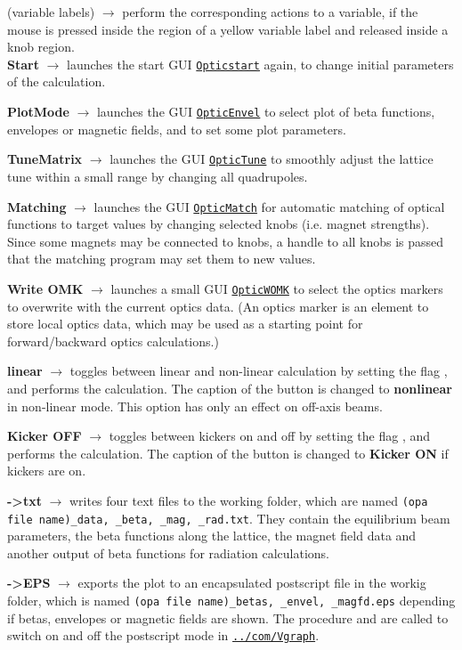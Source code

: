\documentclass[12pt]{article}
\newcommand\code[1]{{\tt #1}}
\newcommand{\ofld}[1]{\colorbox{black!15}{{\bf #1}}}
\newcommand{\ofldx}[1]{\colorbox{black!15}{(#1)}}
\newcommand\guico[1]{{\color{blue}\code{#1}}}
\newcommand\guifco[1]{{\color{violet}\code{#1}}}
\newcommand{\unico}[1]{{\color{burntorange}\code{#1}}}
\newcommand{\evcod}[2]{\ofld{#1} $\rightarrow$ \guico{#2}}
\newcommand{\evcodx}[2]{\ofldx{#1} $\rightarrow$ \guico{#2}}
\newcommand{\opagui}[1]{\colorbox{blue!20}{\code{#1}}}
\newcommand{\ogui}[1]{\hyperref[#1]{\opagui{#1}}}
\newcommand{\opaguif}[1]{\colorbox{violet!30}{\code{#1}}}
\newcommand{\oguif}[1]{\hyperref[#1]{\opaguif{#1}}}
\begin{document}
{\evcodx{variable labels}{varbutMouseDown, varbutMouseUp} perform the corresponding actions to a variable, if the mouse is pressed inside the region of a yellow variable label and released inside a knob region.\\

\evcod{Start}{butStarClick} launches the start GUI \ogui{Opticstart} again, to change initial parameters of the calculation.

\evcod{PlotMode}{butenvlClick} launches the GUI \ogui{OpticEnvel} to select plot of beta functions, envelopes or magnetic fields, and to set some plot parameters.

\evcod{TuneMatrix}{buttuneClick} launches the GUI \ogui{OpticTune} to smoothly adjust the lattice tune within a small range by changing all quadrupoles.

\evcod{Matching}{butmatClick} launches the GUI \ogui{OpticMatch} for automatic matching of optical functions to target values by changing selected knobs (i.e. magnet strengths). Since some magnets may be connected to knobs, a handle to all knobs is passed that the matching program may set them to new values.

\evcod{Write OMK}{butwomkClick} launches a small GUI \ogui{OpticWOMK} to select the optics markers to overwrite with the current optics data. (An optics marker is an element to store local optics data, which may be used as a starting point for forward/backward optics calculations.)

\evcod{linear}{butnlinClick} toggles between linear and non-linear calculation by setting the flag \unico{UseSext}, and performs the calculation. The caption of the button is changed to \ofld{nonlinear} in non-linear mode. This option has only an effect on off-axis beams.

\evcod{Kicker OFF}{butkickClick} toggles between kickers on and off by setting the flag \unico{UsePulsed}, and performs the calculation. The caption of the button is changed to \ofld{Kicker ON} if kickers are on.

\evcod{-\textgreater txt}{butdataClick} writes four text files to the working folder, which are named \code{(opa file name)\_data, \_beta, \_mag, \_rad.txt}. They contain the equilibrium beam parameters, the beta functions along the lattice, the magnet field data and another output of beta functions for radiation calculations. 

\evcod{-\textgreater EPS}{butepsClick} exports the plot to an encapsulated postscript file in the workig folder, which is named \code{(opa file name)\_betas, \_envel, \_magfd.eps} depending if betas, envelopes or magnetic fields are shown. 
The procedure \guifco{PS\_start} and \guifco{PS\_stop} are called to switch on and off the postscript mode in \oguif{../com/Vgraph}.

}
\end{document}

